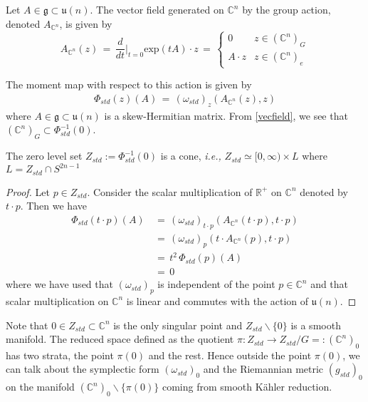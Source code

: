 \documentclass[a4paper,12pt]{article}
\newcommand{\C}{\mathbb{C}}
\newcommand{\R}{\mathbb{R}}
\newcommand{\inv}[1]{#1^{-1}}
\begin{document}
	
	Let $A\in \mathfrak{g} \subset \mathfrak{u}(n)$. The vector field generated on $\C^n$ by the group action, denoted $A_{\C^n}$, is given by
	\begin{equation}\label{vecfield}
		A_{\C^n}(z) \,=\, \frac{d}{dt}\Bigr|_{t=0} \text{exp}(tA)\cdot z \,=\, \begin{cases}
			0 & \text{$z \in (\C^n)_G$} \\
			A \cdot z & \text{$z \in (\C^n)_{e}$}
		\end{cases}
\end{equation}
	
	The moment map with respect to this action is given by
	\begin{align*}\label{standardmoment}
		\Phi_{std}(z) (A) \,=\, (\omega_{std})_z(A_{\C^n}(z), z)
	\end{align*}
	where $A\in \mathfrak{g}\subset \mathfrak{u}(n)$ is a skew-Hermitian matrix. From \eqref{vecfield}, we see that $(\C^n)_G \subset \inv{\Phi_{std}}(0)$.
	
	\begin{lemma}\label{conelemma}
		The zero level set $Z_{std}:=\inv{\Phi_{std}}(0)$ is a cone,  \textit{i.e.,} $Z_{std} \simeq [0,\infty) \times L$ where $L=Z_{std}\cap S^{2n-1}$
	\end{lemma} 
	\begin{proof}
		Let $p\in Z_{std}$. Consider the scalar multiplication of $\R^+$ on $\C^n$ denoted by $t\cdot p$. Then we have
		\begin{equation*}
			\begin{split}
				\Phi_{std}(t\cdot p) (A) \,&=\, (\omega_{std})_{t\cdot p}(A_{\C^n}(t\cdot p), t\cdot p) \\
				&=\,  (\omega_{std})_p(t \cdot A_{\C^n}(p), t\cdot p)\\
				&=\, t^2 \, \Phi_{std}(p)(A)\\
				&=\, 0
			\end{split}
		\end{equation*}
		where we have used that $(\omega_{std})_{p}$ is independent of the point $p\in \C^n$ and that scalar multiplication on $\C^n$ is linear and commutes with the action of $\mathfrak{u}(n)$.
	\end{proof}
	
	Note that $0\in Z_{std} \subset \C^n$ is the only singular point and $Z_{std}\backslash\{0\}$ is a smooth manifold. The reduced space defined as the quotient $\pi:Z_{std} \to Z_{std}/G=:(\C^n)_0$ has two strata, the point $\pi(0)$ and the rest. Hence outside the point $\pi(0)$, we can talk about the symplectic form $(\omega_{std})_0$ and the Riemannian metric $(g_{std})_0$ on the manifold $(\C^n)_0\backslash\{\pi(0)\}$ coming from smooth K\"ahler reduction. 
	
\end{document}
